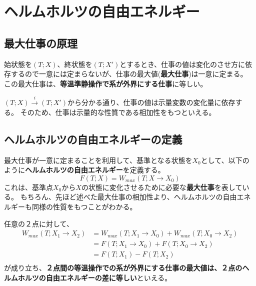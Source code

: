 \documentclass[a4paper]{jsreport}
\begin{document}
        \section{ヘルムホルツの自由エネルギー}

            \subsection*{最大仕事の原理}
                始状態を$(T; X)$、終状態を$(T; X')$とするとき、仕事の値は変化のさせ方に依存するので一意には定まらないが、仕事の最大値(\textbf{最大仕事})は一意に定まる。
                この最大仕事は、\textbf{等温準静操作で系が外界にする仕事}に等しい。\par
                $(T; X)\xrightarrow{i}(T; X')$から分かる通り、仕事の値は示量変数の変化量に依存する。
                そのため、仕事は示量的な性質である相加性をもつといえる。

            \subsection*{ヘルムホルツの自由エネルギーの定義}
                最大仕事が一意に定まることを利用して、基準となる状態を$X_0$として、以下のように\textbf{ヘルムホルツの自由エネルギー}を定義する。
                \begin{equation}
                    F(T; X) = W_{max}(T;X \xrightarrow{} X_0)
                \end{equation}
                これは、基準点$X_0$から$X$の状態に変化させるために必要な\textbf{最大仕事}を表している。
                もちろん、先ほど述べた最大仕事の相加性より、ヘルムホルツの自由エネルギーも同様の性質をもつことがわかる。\par
                任意の２点に対して、
                \begin{align}
                    W_{max}(T; X_1 \xrightarrow{} X_2) &= W_{max}(T; X_1 \xrightarrow{} X_0) + W_{max}(T; X_0 \xrightarrow{} X_2) \\
                    &= F(T;X_1 \xrightarrow{} X_0) + F(T;X_0 \xrightarrow{} X_2) \\
                    &= F(T; X_1) - F(T; X_2) \\
                \end{align}
                が成り立ち、\textbf{２点間の等温操作での系が外界にする仕事の最大値は、２点のヘルムホルツの自由エネルギーの差に等しい}といえる。
\end{document}
